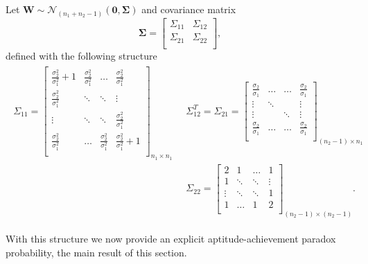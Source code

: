 \documentclass[12pt]{article}
\begin{document}
Let $\mathbf{W} \sim \mathcal{N}_{(n_1 + n_2 - 1)}(\boldsymbol{0}, \boldsymbol{\Sigma})$ and covariance matrix 
\begin{equation}\label{eq:Sigma}
\boldsymbol{\Sigma} = \begin{bmatrix}
	\Sigma_{11} & \Sigma_{12}\\
	\Sigma_{21} & \Sigma_{22}\\
\end{bmatrix},
\end{equation}
defined with the following structure \\
\begin{align}\label{eq:Sigmastructure}
\begin{split}
\Sigma_{11} = \begin{bmatrix}
\frac{\sigma_2^2}{\sigma_1^2}+1 & \frac{\sigma_2^2}{\sigma_1^2} & \hdots & \frac{\sigma_2^2}{\sigma_1^2} \\
\frac{\sigma_2^2}{\sigma_1^2} & \ddots & \ddots  & \vdots \\
\vdots & \ddots & \ddots & \frac{\sigma_2^2}{\sigma_1^2} \\
\frac{\sigma_2^2}{\sigma_1^2} & \dots & \frac{\sigma_2^2}{\sigma_1^2} & \frac{\sigma_2^2}{\sigma_1^2}+1 \\
\end{bmatrix}_{n_1 \times n_1} \;\;
&\Sigma_{12}^{T} = \Sigma_{21} = \begin{bmatrix}
\frac{\sigma_2}{\sigma_1} & \hdots & \hdots & \frac{\sigma_2}{\sigma_1}\\
\vdots & \ddots &  & \vdots\\
\vdots &  & \ddots & \vdots\\
\frac{\sigma_2}{\sigma_1} & \hdots &\hdots & \frac{\sigma_2}{\sigma_1}\\
\end{bmatrix}_{(n_2-1) \times n_1} \\
&\Sigma_{22} = \begin{bmatrix}
2 & 1 & \hdots & 1\\
1 & \ddots & \ddots & \vdots\\
\vdots & \ddots & \ddots & 1\\
1 & \hdots & 1 & 2\\
\end{bmatrix}_{(n_2-1) \times (n_2-1)}.
\end{split}
\end{align}


With this structure we now provide an explicit aptitude-achievement paradox probability, the main result of this section.
\end{document}
